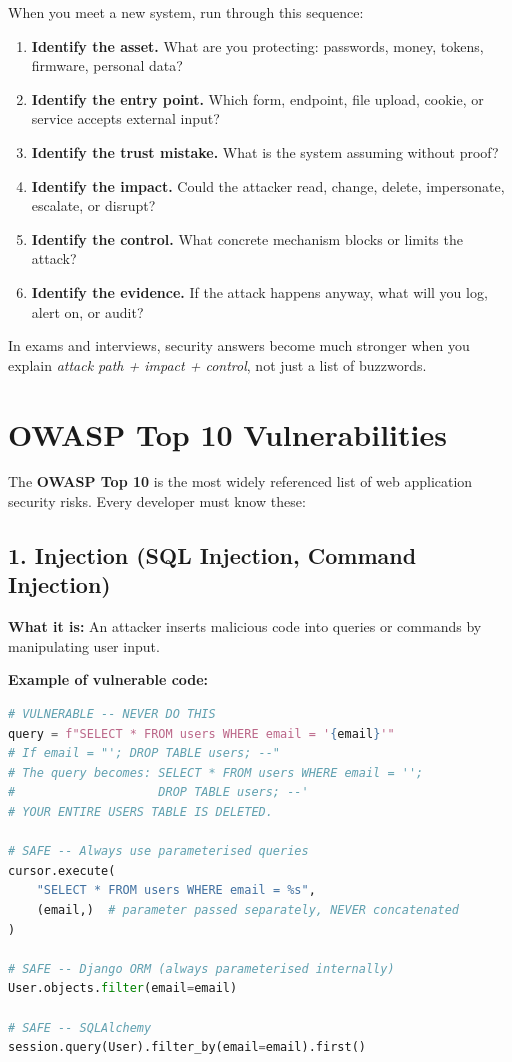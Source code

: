 \documentclass[12pt, a4paper, oneside]{book}
\begin{document}
When you meet a new system, run through this sequence:
\begin{enumerate}[leftmargin=2em]
    \item \textbf{Identify the asset.} What are you protecting: passwords, money, tokens, firmware, personal data?
    \item \textbf{Identify the entry point.} Which form, endpoint, file upload, cookie, or service accepts external input?
    \item \textbf{Identify the trust mistake.} What is the system assuming without proof?
    \item \textbf{Identify the impact.} Could the attacker read, change, delete, impersonate, escalate, or disrupt?
    \item \textbf{Identify the control.} What concrete mechanism blocks or limits the attack?
    \item \textbf{Identify the evidence.} If the attack happens anyway, what will you log, alert on, or audit?
\end{enumerate}

\begin{examtipbox}
In exams and interviews, security answers become much stronger when you explain \emph{attack path + impact + control}, not just a list of buzzwords.
\end{examtipbox}

\section{OWASP Top 10 Vulnerabilities}

The \textbf{OWASP Top 10} is the most widely referenced list of web application security risks. Every developer must know these:

\subsection{1. Injection (SQL Injection, Command Injection)}

\textbf{What it is:} An attacker inserts malicious code into queries or commands by manipulating user input.

\textbf{Example of vulnerable code:}
\begin{lstlisting}[language=Python, caption={SQL Injection: vulnerable vs.\,safe}]
# VULNERABLE -- NEVER DO THIS
query = f"SELECT * FROM users WHERE email = '{email}'"
# If email = "'; DROP TABLE users; --"
# The query becomes: SELECT * FROM users WHERE email = '';
#                    DROP TABLE users; --'
# YOUR ENTIRE USERS TABLE IS DELETED.

# SAFE -- Always use parameterised queries
cursor.execute(
    "SELECT * FROM users WHERE email = %s",
    (email,)  # parameter passed separately, NEVER concatenated
)

# SAFE -- Django ORM (always parameterised internally)
User.objects.filter(email=email)

# SAFE -- SQLAlchemy
session.query(User).filter_by(email=email).first()
\end{lstlisting}
\end{document}
